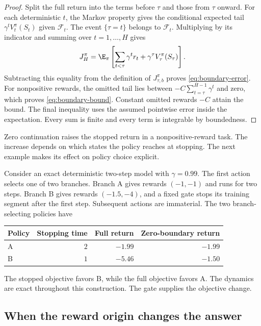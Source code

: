 \begin{proof}
Split the full return into the terms before $\tau$ and those from $\tau$ onward. For each deterministic $t$, the Markov property gives the conditional expected tail $\gamma^tV_t^\pi(S_t)$ given $\mathcal F_t$. The event $\{\tau=t\}$ belongs to $\mathcal F_t$. Multiplying by its indicator and summing over $t=1,\ldots,H$ gives
\[
J_H^\pi=\E_\pi\left[\sum_{t<\tau}\gamma^t r_t+\gamma^\tau V_\tau^\pi(S_\tau)\right].
\]
Subtracting this equality from the definition of $J_{\tau,b}^\pi$ proves \eqref{eq:boundary-error}. For nonpositive rewards, the omitted tail lies between $-C\sum_{t=\tau}^{H-1}\gamma^t$ and zero, which proves \eqref{eq:boundary-bound}. Constant omitted rewards $-C$ attain the bound. The final inequality uses the assumed pointwise error inside the expectation. Every sum is finite and every term is integrable by boundedness.
\end{proof}

Zero continuation raises the stopped return in a nonpositive-reward task. The increase depends on which states the policy reaches at stopping. The next example makes its effect on policy choice explicit.

\begin{example}
\label{ex:stopping}
Consider an exact deterministic two-step model with $\gamma=0.99$. The first action selects one of two branches. Branch A gives rewards $(-1,-1)$ and runs for two steps. Branch B gives rewards $(-1.5,-4)$, and a fixed gate stops its training segment after the first step. Subsequent actions are immaterial. The two branch-selecting policies have
\begin{center}
\begin{tabular}{lrrr}
\toprule
Policy & Stopping time & Full return & Zero-boundary return\\
\midrule
A & $2$ & $-1.99$ & $-1.99$\\
B & $1$ & $-5.46$ & $-1.50$\\
\bottomrule
\end{tabular}
\end{center}
The stopped objective favors B, while the full objective favors A. The dynamics are exact throughout this construction. The gate supplies the objective change.
\end{example}

\subsection{When the reward origin changes the answer}

